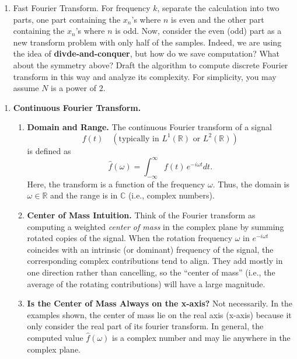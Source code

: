 \documentclass[letterpaper, 11pt]{article}
\newcommand{\1}{\mathds{1}}	%
\theoremstyle{definition}
\newenvironment{solution}{{\par\noindent\it Solution.}}{}
\begin{document}
\begin{enumerate}
    \item Fast Fourier Transform. For frequency $k$, separate the calculation into two parts, one part containing the $x_n$'s where $n$ is even and the other part containing the $x_n$'s where $n$ is odd. Now, consider the even (odd) part as a new transform problem with only half of the samples. Indeed, we are using the idea of \textbf{divde-and-conquer}, but how do we save computation? What about the symmetry above? Draft the algorithm to compute discrete Fourier transform in this way and analyze its complexity. For simplicity, you may assume $N$ is a power of $2$.
\end{enumerate}

\newpage
\begin{solution}
    \begin{enumerate}[label=\arabic*.]
        \item \textbf{Continuous Fourier Transform.}
        \begin{enumerate}[label=(\alph*)]
            \item \textbf{Domain and Range.}  
            The continuous Fourier transform of a signal 
            \[
            f(t) \quad (\text{typically in } L^1(\mathbb{R}) \text{ or } L^2(\mathbb{R}))
            \]
            is defined as
            \[
            \hat{f}(\omega) = \int_{-\infty}^{\infty} f(t)\, e^{-i\omega t}dt.
            \]
            Here, the transform is a function of the frequency $\omega$. Thus, the domain is $\omega \in \mathbb{R}$ and the range is in $\mathbb{C}$ (i.e., complex numbers).
    
            \item \textbf{Center of Mass Intuition.}  
            Think of the Fourier transform as computing a weighted \emph{center of mass} in the complex plane by summing rotated copies of the signal. When the rotation frequency $\omega$ in $e^{-i\omega t}$ coincides with an intrinsic (or dominant) frequency of the signal, the corresponding complex contributions tend to align. They add mostly in one direction rather than cancelling, so the “center of mass” (i.e., the average of the rotating contributions) will have a large magnitude.
    
            \item \textbf{Is the Center of Mass Always on the x-axis?}  
            Not necessarily. In the examples shown, the center of mass lie on the real axis (x-axis) because it only consider the real part of its fourier transform. In general, the computed value $\hat{f}(\omega)$ is a complex number and may lie anywhere in the complex plane.
        \end{enumerate}
        

\end{enumerate}
\end{solution}
\end{document}
